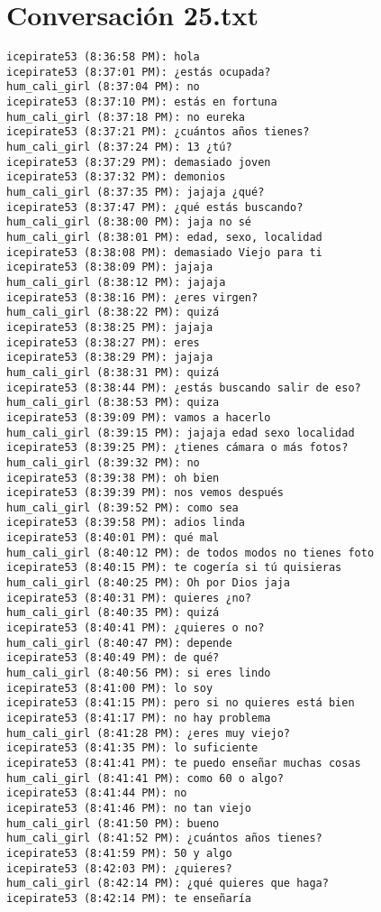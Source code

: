 \section{Conversaci\'on 25.txt}

\begin{verbatim}
icepirate53 (8:36:58 PM): hola
icepirate53 (8:37:01 PM): ¿estás ocupada?
hum_cali_girl (8:37:04 PM): no
icepirate53 (8:37:10 PM): estás en fortuna
hum_cali_girl (8:37:18 PM): no eureka
icepirate53 (8:37:21 PM): ¿cuántos años tienes?
hum_cali_girl (8:37:24 PM): 13 ¿tú?
icepirate53 (8:37:29 PM): demasiado joven
icepirate53 (8:37:32 PM): demonios
hum_cali_girl (8:37:35 PM): jajaja ¿qué?
icepirate53 (8:37:47 PM): ¿qué estás buscando?
hum_cali_girl (8:38:00 PM): jaja no sé
hum_cali_girl (8:38:01 PM): edad, sexo, localidad
icepirate53 (8:38:08 PM): demasiado Viejo para ti
icepirate53 (8:38:09 PM): jajaja
hum_cali_girl (8:38:12 PM): jajaja
icepirate53 (8:38:16 PM): ¿eres virgen?
hum_cali_girl (8:38:22 PM): quizá
icepirate53 (8:38:25 PM): jajaja
icepirate53 (8:38:27 PM): eres
icepirate53 (8:38:29 PM): jajaja
hum_cali_girl (8:38:31 PM): quizá
icepirate53 (8:38:44 PM): ¿estás buscando salir de eso?
hum_cali_girl (8:38:53 PM): quiza 
icepirate53 (8:39:09 PM): vamos a hacerlo
hum_cali_girl (8:39:15 PM): jajaja edad sexo localidad
icepirate53 (8:39:25 PM): ¿tienes cámara o más fotos?
hum_cali_girl (8:39:32 PM): no
icepirate53 (8:39:38 PM): oh bien
icepirate53 (8:39:39 PM): nos vemos después
hum_cali_girl (8:39:52 PM): como sea
icepirate53 (8:39:58 PM): adios linda
icepirate53 (8:40:01 PM): qué mal
hum_cali_girl (8:40:12 PM): de todos modos no tienes foto
icepirate53 (8:40:15 PM): te cogería si tú quisieras
hum_cali_girl (8:40:25 PM): Oh por Dios jaja
icepirate53 (8:40:31 PM): quieres ¿no?
hum_cali_girl (8:40:35 PM): quizá
icepirate53 (8:40:41 PM): ¿quieres o no?
hum_cali_girl (8:40:47 PM): depende
icepirate53 (8:40:49 PM): de qué?
hum_cali_girl (8:40:56 PM): si eres lindo
icepirate53 (8:41:00 PM): lo soy
icepirate53 (8:41:15 PM): pero si no quieres está bien
icepirate53 (8:41:17 PM): no hay problema
hum_cali_girl (8:41:28 PM): ¿eres muy viejo?
icepirate53 (8:41:35 PM): lo suficiente
icepirate53 (8:41:41 PM): te puedo enseñar muchas cosas
hum_cali_girl (8:41:41 PM): como 60 o algo?
icepirate53 (8:41:44 PM): no
icepirate53 (8:41:46 PM): no tan viejo
hum_cali_girl (8:41:50 PM): bueno
hum_cali_girl (8:41:52 PM): ¿cuántos años tienes?
icepirate53 (8:41:59 PM): 50 y algo
icepirate53 (8:42:03 PM): ¿quieres? 
hum_cali_girl (8:42:14 PM): ¿qué quieres que haga?
icepirate53 (8:42:14 PM): te enseñaría

\end{verbatim}
